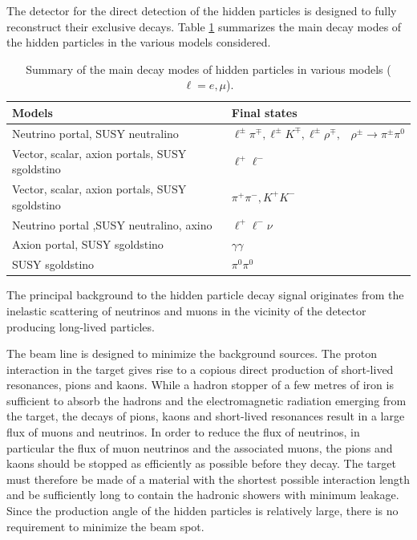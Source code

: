 	The detector for the direct detection of the hidden particles is designed to fully reconstruct their exclusive decays. Table \ref{table:req_decaymodes} summarizes the main decay modes of the hidden particles in the various models considered.
	
	\begin{table}[htb]
\begin{center}
\caption{Summary of the main decay modes of hidden particles in various models ($\ell = e, \mu$).}
\label{table:req_decaymodes}
\vspace{2mm}
\begin{tabular}{ll}
\hline
Models                         	& Final states              \\
\hline
Neutrino portal, SUSY neutralino                 & $\ell^{\pm}\pi^{\mp}, \ell^{\pm} K^{\mp}, \ell^{\pm}\rho^{\mp},\,\,\,\,\, \rho^{\pm}\rightarrow \pi^{\pm}\pi^0$ \\
Vector, scalar, axion portals, SUSY sgoldstino   & $\ell^+\ell^-$ \\
Vector, scalar, axion portals, SUSY sgoldstino   & $\pi^+\pi^-, K^+K^-$ \\
Neutrino portal ,SUSY neutralino, axino          & $\ell^+\ell^-\nu$ \\
Axion portal, SUSY sgoldstino                    & $\gamma\gamma$ \\
SUSY sgoldstino                                  & $\pi^0\pi^0$ \\
\hline
\end{tabular}
\end{center}
\end{table}

	The principal background to the hidden particle decay signal originates from the inelastic scattering of neutrinos and muons in the vicinity of the detector producing long-lived particles.
	
	The beam line is designed to minimize the background sources. The proton
interaction in the target gives rise to a copious direct production of short-lived resonances, pions and kaons. While a hadron stopper of a few metres of iron is sufficient to absorb the hadrons and the electromagnetic radiation emerging from the target, the decays of pions, kaons and short-lived resonances result in a large flux of muons and neutrinos. In order to reduce the flux of neutrinos, in particular the flux of muon neutrinos and the associated muons, the pions and kaons should be stopped as efficiently as possible before they decay. The target must therefore be made of a material with the shortest possible interaction length and be sufficiently long to contain the hadronic showers with minimum leakage. Since the production angle of the  hidden particles is relatively large, there is no requirement to minimize the beam spot.

